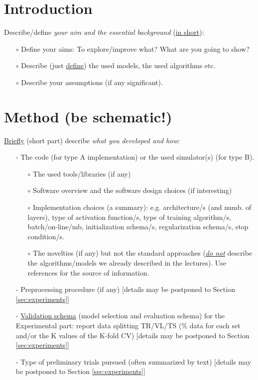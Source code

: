 \documentclass[12pt, letterpaper]{article}  %
\begin{document}
\section{Introduction}
Describe/define \textit{your aim and the essential background} (\underline{in short}):
\begin{itemize}
    \setlength\itemsep{0em}
    \item[$\circ$] Define your aims: To explore/improve what? What are you going to show?
    \item[$\circ$] Describe (just \underline{define}) the used models, the used algorithms  etc. 
    \item[$\circ$] Describe your assumptions (if any significant).
\end{itemize} 

\section{Method (be schematic!)}
\underline{Briefly} (short part) describe \textit{what you developed and how}:
\begin{itemize}
    \setlength\itemsep{0em}
    \item[-] The code (for type A implementation) or the used simulator(s) (for type B). 
        \begin{itemize}
            \setlength\itemsep{0em}
            \item[$\circ$] The used tools/libraries (if any) 
            \item[$\circ$] Software overview and the software design choices (if interesting)
            \item[$\circ$] Implementation choices (a summary): e.g. architecture/s (and numb. of layers), type of activation function/s, type of training algorithm/s, batch/on-line/mb, initialization schema/s, regularization schema/s, stop condition/s.
            \item[$\circ$] The novelties (if any) but not the standard approaches (\underline{\textit{do not}} describe the algorithms/models we already described in the lectures). Use references for the source of information. 
        \end{itemize}
        \item[-] Preprocessing procedure (if any) [details may be postponed to Section \ref{sec:experiments}]
        \item[-] \underline{Validation schema} (model selection and evaluation schema) for the Experimental part: report data splitting  TR/VL/TS (\% data for each set and/or the K values of the K-fold CV) [details may be postponed to Section \ref{sec:experiments}]
        \item[-] Type of preliminary trials pursued (often summarized by text) [details may be postponed to Section \ref{sec:experiments}]
\end{itemize}
\end{document}
